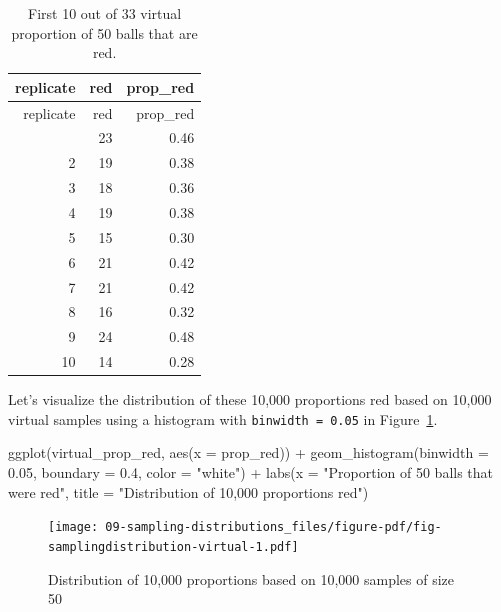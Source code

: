 \documentclass[
  letterpaper,
  DIV=11,
  numbers=noendperiod]{scrreprt}
\newenvironment{Shaded}{\begin{snugshade}}{\end{snugshade}}
\newcommand{\AttributeTok}[1]{\textcolor[rgb]{0.40,0.45,0.13}{#1}}
\newcommand{\FloatTok}[1]{\textcolor[rgb]{0.68,0.00,0.00}{#1}}
\newcommand{\FunctionTok}[1]{\textcolor[rgb]{0.28,0.35,0.67}{#1}}
\newcommand{\NormalTok}[1]{\textcolor[rgb]{0.00,0.23,0.31}{#1}}
\newcommand{\SpecialCharTok}[1]{\textcolor[rgb]{0.37,0.37,0.37}{#1}}
\newcommand{\StringTok}[1]{\textcolor[rgb]{0.13,0.47,0.30}{#1}}
\theoremstyle{definition}
\theoremstyle{remark}
\begin{document}
\hypertarget{tbl-virtualred}{}
\begin{longtable}[]{@{}rrr@{}}
\caption{\label{tbl-virtualred}First 10 out of 33 virtual proportion of
50 balls that are red.}\tabularnewline
\toprule\noalign{}
replicate & red & prop\_red \\
\midrule\noalign{}
\endfirsthead
\toprule\noalign{}
replicate & red & prop\_red \\
\midrule\noalign{}
\endhead
\bottomrule\noalign{}
\endlastfoot
1 & 23 & 0.46 \\
2 & 19 & 0.38 \\
3 & 18 & 0.36 \\
4 & 19 & 0.38 \\
5 & 15 & 0.30 \\
6 & 21 & 0.42 \\
7 & 21 & 0.42 \\
8 & 16 & 0.32 \\
9 & 24 & 0.48 \\
10 & 14 & 0.28 \\
\end{longtable}

Let's visualize the distribution of these 10,000 proportions red based
on 10,000 virtual samples using a histogram with
\texttt{binwidth\ =\ 0.05} in
Figure~\ref{fig-samplingdistribution-virtual}.

\begin{Shaded}
\begin{Highlighting}[]
\FunctionTok{ggplot}\NormalTok{(virtual\_prop\_red, }\FunctionTok{aes}\NormalTok{(}\AttributeTok{x =}\NormalTok{ prop\_red)) }\SpecialCharTok{+}
  \FunctionTok{geom\_histogram}\NormalTok{(}\AttributeTok{binwidth =} \FloatTok{0.05}\NormalTok{, }\AttributeTok{boundary =} \FloatTok{0.4}\NormalTok{, }\AttributeTok{color =} \StringTok{"white"}\NormalTok{) }\SpecialCharTok{+}
  \FunctionTok{labs}\NormalTok{(}\AttributeTok{x =} \StringTok{"Proportion of 50 balls that were red"}\NormalTok{, }
       \AttributeTok{title =} \StringTok{"Distribution of 10,000 proportions red"}\NormalTok{) }
\end{Highlighting}
\end{Shaded}

\begin{figure}

{\centering \texttt{[image: 09-sampling-distributions\_files/figure-pdf/fig-samplingdistribution-virtual-1.pdf]}

}

\caption{\label{fig-samplingdistribution-virtual}Distribution of 10,000
proportions based on 10,000 samples of size 50}

\end{figure}
\end{document}

